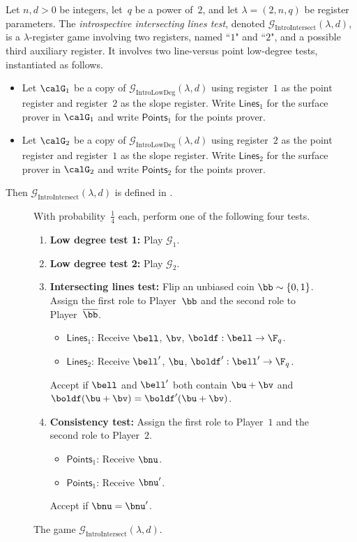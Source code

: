 \documentclass[11pt]{article}
\newcommand{\game}{\mathscr{G}}
\begin{document}
\begin{definition}
Let $n, d> 0$ be integers, let~$q$ be a power of~$2$, and let $\lambda = (2, n, q)$ be register parameters.
The \emph{introspective intersecting lines test}, denoted $\game_{\mathrm{IntroIntersect}}(\lambda, d)$,
is a $\lambda$-register game involving two registers, named ``$1$" and ``$2$", and a possible third auxiliary register.
It involves two line-versus point low-degree tests, instantiated as follows.
\begin{itemize}
\item[$\circ$] Let $\calG_1$ be a copy of $\game_{\mathrm{IntroLowDeg}}(\lambda, d)$
		using register~$1$ as the point register and register~$2$ as the slope register.
	Write $\mathsf{Lines}_1$ for the surface prover in $\calG_1$ and write $\mathsf{Points}_1$ for the points prover.
\item[$\circ$] Let $\calG_2$ be a copy of $\game_{\mathrm{IntroLowDeg}}(\lambda, d)$
		using register~$2$ as the point register and register~$1$ as the slope register.
	Write $\mathsf{Lines}_2$ for the surface prover in $\calG_2$ and write $\mathsf{Points}_2$ for the points prover.
\end{itemize}
Then $\game_{\mathrm{IntroIntersect}}(\lambda, d)$ is defined in .
\end{definition}

{
\begin{figure}
With probability~$\tfrac{1}{4}$ each, perform one of the following four tests.
\begin{enumerate}
	\item \textbf{Low degree test 1:} Play $\game_1$.
	\item \textbf{Low degree test 2:} Play $\game_2$.
	\item \textbf{Intersecting lines test:} Flip an unbiased coin $\bb \sim \{0, 1\}$.
		Assign the first role to Player~$\bb$ and the second role to Player~$\overline{\bb}$.
		\begin{itemize}
		\item[$\circ$] $\mathsf{Lines}_1$: Receive $\bell$, $\bv$, $\boldf:\bell\rightarrow \F_q$.
		\item[$\circ$] $\mathsf{Lines}_2$: Receive $\bell'$, $\bu$, $\boldf':\bell'\rightarrow \F_q$.
		\end{itemize}
		Accept if $\bell$ and $\bell'$ both contain $\bu + \bv$ and $\boldf(\bu + \bv) = \boldf'(\bu + \bv)$.
	\item \textbf{Consistency test:} Assign the first role to Player~$1$ and the second role to Player~$2$.
		\begin{itemize}
		\item[$\circ$] $\mathsf{Points}_1$: Receive $\bnu$.
		\item[$\circ$] $\mathsf{Points}_1$: Receive $\bnu'$.
		\end{itemize}
		Accept if $\bnu = \bnu'$.
	\end{enumerate}
	\caption{The game $\game_{\mathrm{IntroIntersect}}(\lambda, d)$.\label{fig:big-transfer}}
\end{figure}
}
\end{document}
